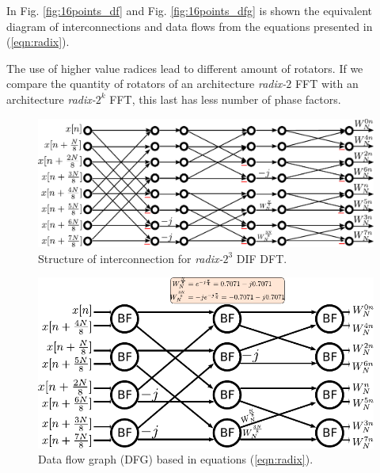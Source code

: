 \documentclass[journal,comsoc]{IEEEtran}
\begin{document}
In Fig. \ref{fig:16points_df} and Fig. \ref{fig:16points_dfg} is shown the equivalent diagram of interconnections and data flows from the equations presented in (\ref{eqn:radix}).

The use of higher value radices lead to different amount of rotators. If we compare the quantity of rotators of an architecture \textit{radix-}$2$ FFT with an architecture \textit{radix-}$2^k$ FFT, this last has less number of phase factors.
\\

\begin{figure} 
	\centering
	\includegraphics[width=\linewidth]{Diagramas/miSeccionFiguras/8PuntosRadix8Conexion.pdf}
	\caption{Structure of interconnection for \textit{radix-}$2^3$ DIF DFT.}
	\label{fig:8ponits_df}
\end{figure}


\begin{figure}
	\centering
	\includegraphics[width=\linewidth]{Diagramas/miSeccionFiguras/8PuntosRadix8Burbujas.pdf}
	\caption{Data flow graph (DFG) based in equations (\ref{eqn:radix}).}
	\label{fig:128ponits_dfg}
\end{figure}
\end{document}
